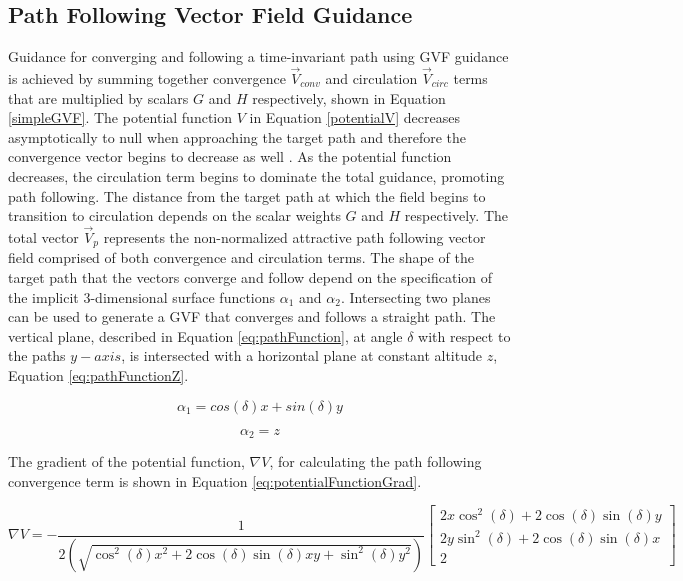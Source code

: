 \documentclass[numbered,pdftex]{ohio-etd}
\begin{document}
\subsection{Path Following Vector Field Guidance}
Guidance for converging and following a time-invariant path using GVF guidance is achieved by summing together convergence $\overrightarrow{V}_{conv}$ and circulation $\overrightarrow{V}_{circ}$ terms that are multiplied by scalars $G$ and $H$ respectively, shown in Equation \ref{simpleGVF}. The potential function $V$ in Equation \ref{potentialV} decreases asymptotically to null when approaching the target path and therefore the convergence vector begins to decrease as well \cite{goncalves_artificial_2009}. As the potential function decreases, the circulation term begins to dominate the total guidance, promoting path following. The distance from the target path at which the field begins to transition to circulation depends on the scalar weights $G$ and $H$ respectively. The total vector $\overrightarrow{V}_p$ represents the non-normalized attractive path following vector field comprised of both convergence and circulation terms. The shape of the target path that the vectors converge and follow depend on the specification of the implicit 3-dimensional surface functions $\alpha_1$ and $\alpha_2$. Intersecting two planes can be used to generate a GVF that converges and follows a straight path. The vertical plane, described in Equation \ref{eq:pathFunction}, at angle $\delta$ with respect to the paths $y-axis$, is intersected with a horizontal plane at constant altitude $z$, Equation \ref{eq:pathFunctionZ}.



\begin{equation}
\label{eq:pathFunction}
\alpha_1 = cos(\delta)x + sin(\delta)y
\end{equation}

\begin{equation}
\label{eq:pathFunctionZ}
\alpha_2 = z
\end{equation}



\noindent
The gradient of the potential function, $\nabla V$, for calculating the path following convergence term is shown in Equation \ref{eq:potentialFunctionGrad}.

\begin{equation}
\label{eq:potentialFunctionGrad}
\nabla V = -\frac{1}{2(\sqrt{\cos^2(\delta) x^2+2\cos(\delta)\sin(\delta) xy +\sin^2 (\delta) y^2})} \begin{bmatrix}
2x\cos^2(\delta) + 2\cos(\delta)\sin(\delta) y \\
2y\sin^2(\delta) + 2\cos(\delta)\sin(\delta) x \\
2
\end{bmatrix}
\end{equation}
\end{document}
